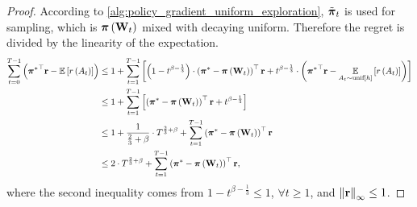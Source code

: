 \begin{proof}
According to \cref{alg:policy_gradient_uniform_exploration}, $\tilde{{\boldsymbol{\pi}}}_t$ is used for sampling, which is ${\boldsymbol{\pi}}\left( {\mathbf{W}}_t \right)$ mixed with decaying uniform. Therefore the regret is divided by the linearity of the expectation.
\begin{equation}
\label{eq:total_regret_decomposition}
\begin{split}
    \sum\limits_{t=0}^{T-1}{ \left( {{\boldsymbol{\pi}}^*}^\top {\mathbf{r}} - {\mathbb{E}} \left[ r\left(A_t\right) \right] \right) } &\le 1 + \sum\limits_{t=1}^{T-1}{ \left[ \left( 1 - t^{ \beta - \frac{1}{3}} \right) \cdot \left( {{\boldsymbol{\pi}}^*} - {\boldsymbol{\pi}}\left( {\mathbf{W}}_t \right) \right)^\top {\mathbf{r}} + t^{ \beta - \frac{1}{3}} \cdot \left( {{\boldsymbol{\pi}}^*}^\top {\mathbf{r}} - \operatorname*{{\mathbb{E}}}\limits_{A_t \sim {\text{unif}}[h]}{ \left[ r\left(A_t\right) \right] } \right) \right]} \\
    &\le 1 + \sum\limits_{t=1}^{T-1}{ \left[ \left( {{\boldsymbol{\pi}}^*} - {\boldsymbol{\pi}}\left( {\mathbf{W}}_t \right) \right)^\top {\mathbf{r}} + t^{ \beta - \frac{1}{3}} \right]} \\
    &\le 1 + \frac{1}{\frac{2}{3} + \beta} \cdot T^{\frac{2}{3} + \beta} + \sum\limits_{t=1}^{T-1}{ \left( {{\boldsymbol{\pi}}^*} - {\boldsymbol{\pi}}\left( {\mathbf{W}}_t \right) \right)^\top {\mathbf{r}} } \\
    &\le 2 \cdot T^{\frac{2}{3} + \beta} + \sum\limits_{t=1}^{T-1}{ \left( {{\boldsymbol{\pi}}^*} - {\boldsymbol{\pi}}\left( {\mathbf{W}}_t \right) \right)^\top {\mathbf{r}} },
\end{split}
\end{equation}
where the second inequality comes from $1 - t^{ \beta - \frac{1}{3}} \le 1$, $\forall t \ge 1$, and $\left\| {\mathbf{r}} \right\|_\infty \le 1$.


\end{proof}

